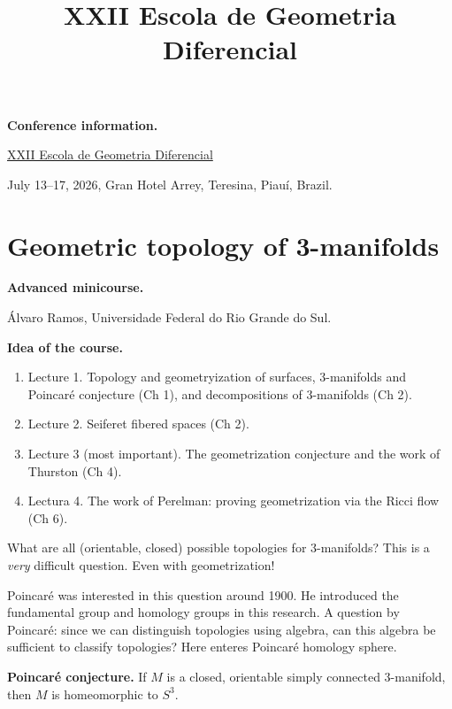 


\title{XXII Escola de Geometria
Diferencial}
\maketitle
{}
\label{section-phantom}
\tableofcontents

\medskip\noindent
{\bf Conference information.}

\href{https://egd.ufpi.edu.br/home}{%
XXII Escola de Geometria Diferencial}

July 13--17, 2026,
Gran Hotel Arrey,
Teresina, Piau\'i, Brazil.


\section{Geometric topology of
3-manifolds}
\label{%
section-geometric-topology-three-manifolds%
}

\medskip\noindent
{\bf Advanced minicourse.}

\'Alvaro Ramos,
Universidade Federal do Rio Grande do Sul.

\medskip\noindent
{\bf Idea of the course.}
\begin{enumerate}
\item Lecture 1. Topology and
geometryization of surfaces, 3-manifolds
and Poincaré conjecture (Ch 1), and decompositions
of 3-manifolds (Ch 2).
\item Lecture 2. Seiferet fibered spaces (Ch
2).
\item Lecture 3 (most important).
The geometrization conjecture and the work
of Thurston (Ch 4).
\item Lectura 4. The work of Perelman:
proving geometrization via the Ricci flow
(Ch 6).
\end{enumerate}

\medskip\noindent
What are all (orientable, closed) possible
topologies for 3-manifolds? This is a
{\it very} difficult question. Even
with geometrization!

Poincaré was interested in this question
around 1900. He introduced the fundamental
group and homology groups in this research.
A question by Poincaré: since we can
distinguish topologies using algebra, can
this algebra be sufficient to classify
topologies? Here enteres Poincaré
homology sphere.

\medskip\noindent
{\bf Poincaré conjecture.}
If $M$ is a closed, orientable
simply connected 3-manifold, then $M$
is homeomorphic to $S^3$.

